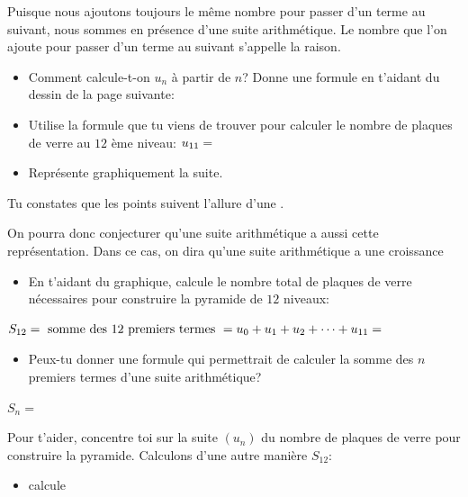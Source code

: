 \documentclass[a4paper,12pt]{report}
\begin{document}
Puisque nous ajoutons toujours le même nombre pour passer d’un terme
au suivant, nous sommes en présence d’une suite arithmétique. Le nombre que l’on
ajoute pour passer d’un terme au suivant s’appelle la raison.

\begin{itemize}
\item Comment calcule-t-on \(u_{n}\) à partir de \(n\)? Donne une formule en t'aidant
du dessin de la page suivante:
\dotfill

\dotfill

\begin{center}

\end{center}

\item Utilise la formule que tu viens de trouver pour calculer le nombre
de plaques de verre au \(12\) ème niveau: \(u_{11}=\dotfill\)

\item Représente graphiquement la suite.
\end{itemize}

\begin{center}

\end{center}

Tu constates que les points suivent l'allure d'une \dotfill.

On pourra donc conjecturer qu'une suite arithmétique a aussi cette
représentation. Dans ce cas, on dira qu'une suite arithmétique a une
croissance \dotfill

\begin{itemize}
\item En t'aidant du graphique, calcule le nombre total de plaques de verre nécessaires pour construire la pyramide de \(12\) niveaux:
\end{itemize}


\(S_{12}=\text{ somme des 12 premiers termes }=u_{0}+u_{1}+u_{2}+\cdots+u_{11}=\dotfill\)


\begin{itemize}
\item Peux-tu donner une formule qui permettrait de calculer la somme des
\(n\) premiers termes d'une suite arithmétique?
\end{itemize}


\(S_{n}=\) \dotfill

\dotfill


Pour t'aider, concentre toi sur la suite \((u_{n})\) du nombre de
plaques de verre pour construire la pyramide. Calculons d'une autre
manière \(S_{12}\):
\begin{itemize}
\item calcule
\end{itemize}
\end{document}
